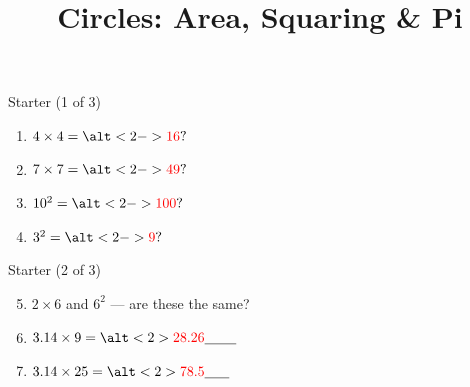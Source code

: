 \documentclass{beamer}
\title{Circles: Area, Squaring \& Pi}
\author{}
\date{}
\newcommand{\ablank}[1]{%
  \alt<2>{\textcolor{red}{#1}}{\underline{\phantom{#1}}}%
}
\newcommand{\ashow}[1]{\uncover<2->{\textcolor{red}{\small #1}}}
\newcommand{\ashowq}[1]{\alt<2->{\textcolor{red}{\small #1}}{?}}
\begin{document}
\frame{\titlepage}

\begin{frame}{Starter (1 of 3)}
\small
\begin{enumerate}
  \item $4 \times 4 = \ashowq{16}$
  \item $7 \times 7 = \ashowq{49}$
  \item $10^2 = \ashowq{100}$
  \item $3^2 = \ashowq{9}$
\end{enumerate}
\end{frame}

\begin{frame}{Starter (2 of 3)}
\small
\begin{enumerate}
  \setcounter{enumi}{4}
  \item $2 \times 6$ and $6^2$ --- are these the same? \ashow{No: $12\neq 36$.}
  \item $3.14 \times 9=\ablank{28.26}$
  \item $3.14 \times 25=\ablank{78.5}$
\end{enumerate}
\end{frame}
\end{document}
